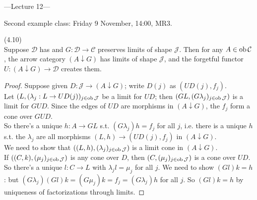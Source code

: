 \documentclass[a4paper]{article}
\begin{document}
---Lecture 12---

Second example class: Friday 9 November, 14:00, MR3.

\begin{lemma} (4.10)\\
    Suppose $\mathcal{D}$ has and $G:\mathcal{D} \to \mathcal{C}$ preserves limits of shape $\mathcal{J}$. Then for any $A \in \operatorname{ob} \mathcal{C}$, the arrow category $(A \downarrow G)$ has limits of shape $\mathcal{J}$, and the forgetful functor $U:(A \downarrow G) \to \mathcal{D}$ creates them.
    \begin{proof}
        Suppose given $D:\mathcal{J} \to (A\downarrow G)$; write $D(j)$ as $(UD(j),f_j)$.\\
        Let $(L,(\lambda_j:L \to UD(j))_{j \in \operatorname{ob}\mathcal{J}}$ be a limit for $UD$; then $(GL,(G\lambda_j)_{j \in \operatorname{ob}\mathcal{J}})$ is a limit for $GUD$. Since the edges of $UD$ are morphisms in $(A \downarrow G)$, the $f_j$ form a cone over $GUD$.\\
        So there's a unique $h:A \to GL$ s.t. $(G\lambda_j)h = f_j$ for all $j$, i.e. there is a unique $h$ s.t. the $\lambda_j$ are all morphisms $(L,h) \to (UD(j),f_j)$ in $(A \downarrow G)$.\\
        We need to show that $((L,h),(\lambda_j)_{j \in \operatorname{ob}\mathcal{J}})$ is a limit cone in $(A \downarrow G)$.\\
        If $((C,k),(\mu_j)_{j \in \operatorname{ob}\mathcal{J}})$ is any cone over $D$, then $(C,(\mu_j)_{j \in \operatorname{ob}\mathcal{J}})$ is a cone over $UD$. So there's a unique $l:C \to L$ with $\lambda_j l = \mu_j$ for all $j$. We need to show $(Gl)k = h$: but $(G\lambda_j) (Gl)k = (G\mu_j)k = f_j = (G\lambda_j) h$ for all $j$. So $(Gl)k = h$ by uniqueness of factorizations through limits.
    \end{proof}
\end{lemma}
\end{document}
